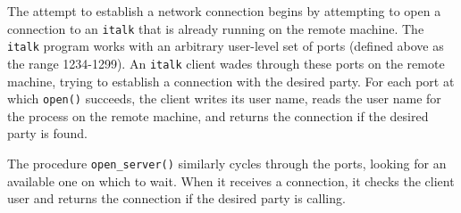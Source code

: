 
The attempt to establish a network connection begins by attempting to
open a connection to an \texttt{italk} that is already running on the
remote machine. The \texttt{italk} program works with an arbitrary
user-level set of ports (defined above as the range 1234-1299). An
\texttt{italk} client wades through these ports on the remote machine,
trying to establish a connection with the desired party. For each port
at which \texttt{open()} succeeds, the client writes its user name,
reads the user name for the process on the remote machine, and returns
the connection if the desired party is found.


The procedure \texttt{open\_server()} similarly cycles through the
ports, looking for an available one on which to wait. When it receives
a connection, it checks the client user and returns the connection if
the desired party is calling.

